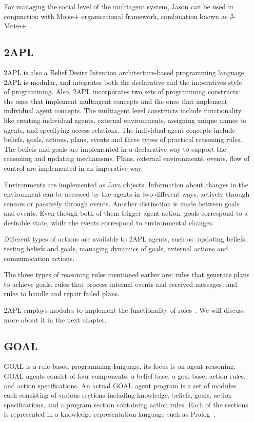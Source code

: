 \documentclass[a4paper,12pt,oneside,fleqn]{book} %
\begin{document}
For managing the social level of the multiagent system, Jason can be used
in conjunction with Moise+ organisational framework, combination known as
J-Moise+~\cite{hubner2007j}.


\subsection{2APL} %
2APL is also a Belief Desire Intention architecture-based programming
language. 2APL is modular, and integrates both the declarative and the
imperatives style of programming. Also, 2APL incorporates two sets of
programming constructs: the ones that implement multiagent concepts and the
ones that implement individual agent concepts. The multiagent level
constructs include functionality like creating individual agents, external
environments, assigning unique names to agents, and specifying access
relations. The individual agent concepts include beliefs, goals, actions,
plans, events and three types of practical reasoning rules. The beliefs and
goals are implemented in a declarative way to support the reasoning and
updating mechanisms. Plans, external environments, events, flow of control
are implemented in an imperative way.

Environments are implemented as Java objects. Information about changes in
the environment can be accessed by the agents in two different ways,
actively through sensors or passively through events. Another distinction
is made between goals and events. Even though both of them trigger agent
action, goals correspond to a desirable state, while the events correspond
to environmental changes.

Different types of actions are available to 2APL agents, such as: updating
beliefs, testing beliefs and goals, managing dynamics of goals, external
actions and communication actions.

The three types of reasoning rules mentioned earlier are: rules that
generate plans to achieve goals, rules that process internal events and
received messages, and rules to handle and repair failed plans.

2APL employs modules to implement the functionality of
roles~\cite{dblp:conf/prima/dastanims08}. We will discuss more about it in
the next chapter.

\subsection{GOAL} %
GOAL is a rule-based programming language, its focus is on agent reasoning.
GOAL agents consist of four components: a belief base, a goal base, action
rules, and action specifications. An actual GOAL agent program is a set of
modules each consisting of various sections including knowledge, beliefs,
goals, action specifications, and a program section containing action
rules. Each of the sections is represented in a knowledge representation
language such as Prolog~\cite{DBLP:books/daglib/0076175}.
\end{document}
